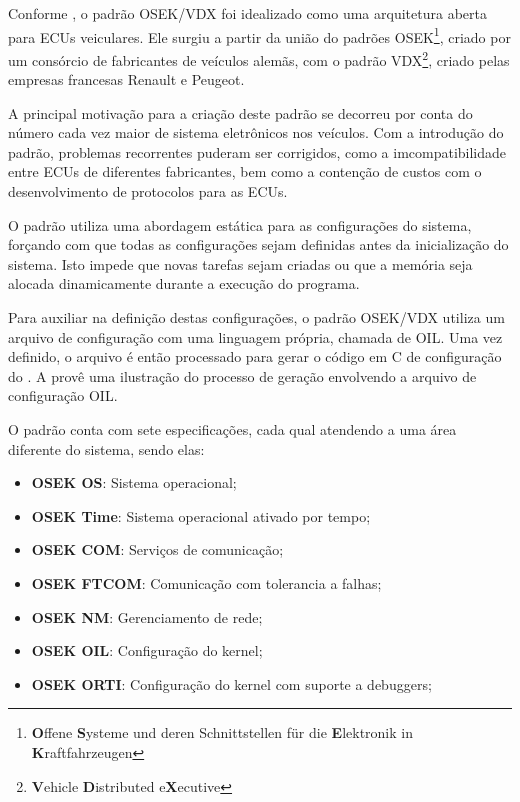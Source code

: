 Conforme , o padrão OSEK/VDX foi idealizado como uma arquitetura aberta para ECUs veiculares. Ele surgiu a partir da união do padrões OSEK\footnote{\textbf{O}ffene \textbf{S}ysteme und deren Schnittstellen für die \textbf{E}lektronik in \textbf{K}raftfahrzeugen}, criado por um consórcio de fabricantes de veículos alemãs, com o padrão VDX\footnote{\textbf{V}ehicle \textbf{D}istributed e\textbf{X}ecutive}, criado pelas empresas francesas Renault e Peugeot. 

A principal motivação para a criação deste padrão se decorreu por conta do número cada vez maior de sistema eletrônicos nos veículos. Com a introdução do padrão, problemas recorrentes puderam ser corrigidos, como a imcompatibilidade entre ECUs de diferentes fabricantes, bem como a contenção de custos com o desenvolvimento de protocolos para as ECUs.

O padrão utiliza uma abordagem estática para as configurações do sistema, forçando com que todas as configurações sejam definidas antes da inicialização do sistema. Isto impede que novas tarefas sejam criadas ou que a memória seja alocada dinamicamente durante a execução do programa.

Para auxiliar na definição destas configurações, o padrão OSEK/VDX utiliza um arquivo de configuração com uma linguagem própria, chamada de OIL. Uma vez definido, o arquivo é então processado para gerar o código em C de configuração do . A  provê uma ilustração do processo de geração envolvendo a arquivo de configuração OIL.


O padrão conta com sete especificações, cada qual atendendo a uma área diferente do sistema, sendo elas:

\begin{itemize}
	\item \textbf{OSEK OS}: Sistema operacional;
	\item \textbf{OSEK Time}: Sistema operacional ativado por tempo;
	\item \textbf{OSEK COM}: Serviços de comunicação;
	\item \textbf{OSEK FTCOM}: Comunicação com tolerancia a falhas;
	\item \textbf{OSEK NM}: Gerenciamento de rede;
	\item \textbf{OSEK OIL}: Configuração do kernel;
	\item \textbf{OSEK ORTI}: Configuração do kernel com suporte a debuggers;
\end{itemize}

